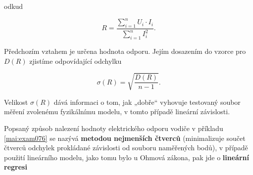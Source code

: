       odkud
      \begin{mdframed}[style=highlight]
        \begin{equation}\label{mai:eq073}
          R=  \dfrac{\sum_{i = 1}^{n}U_i\cdot I_i}{\sum_{i = 1}^{n}I_i^2}.
        \end{equation}
      \end{mdframed}
      Předchozím vztahem je určena hodnota odporu. Jejím dosazením do vzorce pro \(D(R)\) zjistíme
      odpovídající odchylku
      \begin{mdframed}[style=highlight]
        \begin{equation*}
          \sigma(R) = \sqrt{\dfrac{D(R)}{n-1}}.
        \end{equation*}
      \end{mdframed}
      Velikost \(\sigma(R)\) dává informaci o tom, jak „dobře“ vyhovuje testovaný soubor měření 
      zvolenému fyzikálnímu modelu, v tomto případě lineární závislosti.

      
      
      Popsaný způsob nalezení hodnoty elektrického odporu vodiče v příkladu \ref{mai:exam076} se
      nazývá\textbf{ metodou nejmenších čtverců} (minimalizuje součet čtverců odchylek prokládané
      závislosti od souboru naměřených bodů), v případě použití lineárního modelu, jako tomu bylo u
      Ohmová zákona, pak jde o \textbf{lineární regresi}
      

